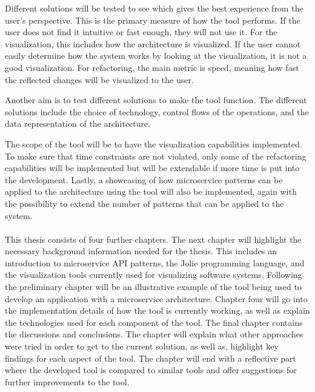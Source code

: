 Different solutions will be tested to see which gives the best experience from the user's perspective. This is the primary measure of how the tool performs. If the user does not find it intuitive or fast enough, they will not use it.
For the visualization, this includes how the architecture is visualized. If the user cannot easily determine how the system works by looking at the visualization, it is not a good visualization.
For refactoring, the main metric is speed, meaning how fast the reflected changes will be visualized to the user.

Another aim is to test different solutions to make the tool function.
The different solutions include the choice of technology, control flows of the operations, and the data representation of the architecture.

The scope of the tool will be to have the visualization capabilities implemented.
To make sure that time constraints are not violated, only some of the refactoring capabilities will be implemented but will be extendable if more time is put into the development.
Lastly, a showcasing of how microservice patterns can be applied to the architecture using the tool will also be implemented, again with the possibility to extend the number of patterns that can be applied to the system.
\\
\\
This thesis consists of four further chapters. The next chapter will highlight the necessary background information needed for the thesis. This includes an introduction to microservice API patterns, the Jolie programming language, and the visualization tools currently used for visualizing software systems.
Following the preliminary chapter will be an illustrative example of the tool being used to develop an application with a microservice architecture.
Chapter four will go into the implementation details of how the tool is currently working, as well as explain the technologies used for each component of the tool.
The final chapter contains the discussions and conclusions. The chapter will explain what other approaches were tried in order to get to the current solution, as well as, highlight key findings for each aspect of the tool.
The chapter will end with a reflective part where the developed tool is compared to similar tools and offer suggestions for further improvements to the tool.